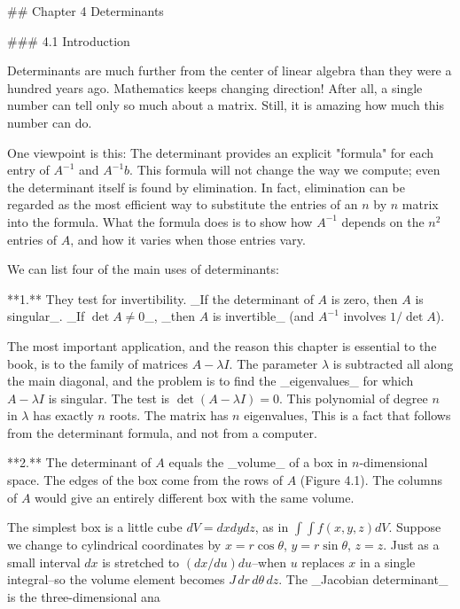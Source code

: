 

## Chapter 4 Determinants

### 4.1 Introduction

Determinants are much further from the center of linear algebra than they were a hundred years ago. Mathematics keeps changing direction! After all, a single number can tell only so much about a matrix. Still, it is amazing how much this number can do.

One viewpoint is this: The determinant provides an explicit "formula" for each entry of \(A^{-1}\) and \(A^{-1}b\). This formula will not change the way we compute; even the determinant itself is found by elimination. In fact, elimination can be regarded as the most efficient way to substitute the entries of an \(n\) by \(n\) matrix into the formula. What the formula does is to show how \(A^{-1}\) depends on the \(n^{2}\) entries of \(A\), and how it varies when those entries vary.

We can list four of the main uses of determinants:

**1.** They test for invertibility. _If the determinant of \(A\) is zero, then \(A\) is singular_. _If \(\det A\neq 0\)_, _then \(A\) is invertible_ (and \(A^{-1}\) involves \(1/\det A\)).

The most important application, and the reason this chapter is essential to the book, is to the family of matrices \(A-\lambda I\). The parameter \(\lambda\) is subtracted all along the main diagonal, and the problem is to find the _eigenvalues_ for which \(A-\lambda I\) is singular. The test is \(\det(A-\lambda I)=0\). This polynomial of degree \(n\) in \(\lambda\) has exactly \(n\) roots. The matrix has \(n\) eigenvalues, This is a fact that follows from the determinant formula, and not from a computer.

**2.** The determinant of \(A\) equals the _volume_ of a box in \(n\)-dimensional space. The edges of the box come from the rows of \(A\) (Figure 4.1). The columns of \(A\) would give an entirely different box with the same volume.

The simplest box is a little cube \(dV=dxdydz\), as in \(\int\!\!\!\int f(x,y,z)dV\). Suppose we change to cylindrical coordinates by \(x=r\cos\theta\), \(y=r\sin\theta\), \(z=z\). Just as a small interval \(dx\) is stretched to \((dx/du)du\)--when \(u\) replaces \(x\) in a single integral--so the volume element becomes \(J\,dr\,d\theta\,dz\). The _Jacobian determinant_ is the three-dimensional ana